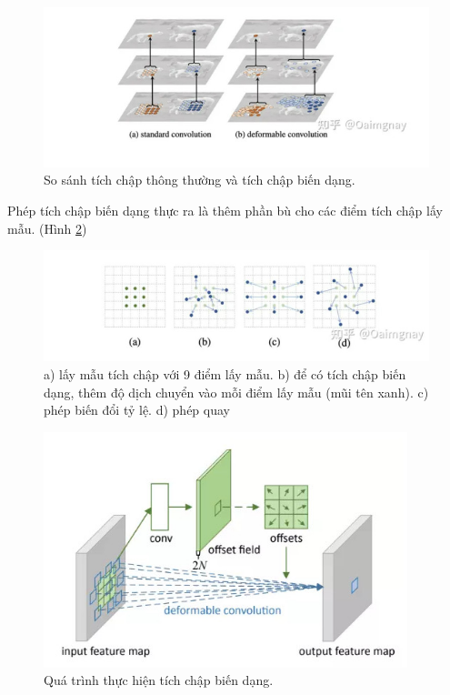 \documentclass[12pt,a4paper,openany,oneside]{report}
\begin{document}
\begin{figure}[ht!]
	\begin{center}
		\includegraphics[width=445px]{./compare_normal_with_deformable_convolution.jpg}
		\caption{So sánh tích chập thông thường và tích chập biến dạng.}
		\label{so_sanh_tich_chap_thong_thuong_deformable}
	\end{center}
\end{figure} 

Phép tích chập biến dạng thực ra là thêm phần bù cho các điểm tích chập lấy mẫu. (Hình \ref{offset_deformable_convolution})

\begin{figure}[ht!]
	\begin{center}
		\includegraphics[width=445px]{./feature_offset_type.jpg}
		\caption{a) lấy mẫu tích chập với 9 điểm lấy mẫu. b) để có tích chập biến dạng, thêm độ dịch chuyển vào mỗi điểm lấy mẫu (mũi tên xanh). c) phép biến đổi tỷ lệ. d) phép quay
		}
		\label{offset_deformable_convolution}
	\end{center}
\end{figure} 

\begin{figure}[ht!]
	\begin{center}
		\includegraphics[width=400px]{./deformable_process.jpg}
		\caption{Quá trình thực hiện tích chập biến dạng.}
		\label{deformable_process}
	\end{center}
\end{figure} 
\end{document}
